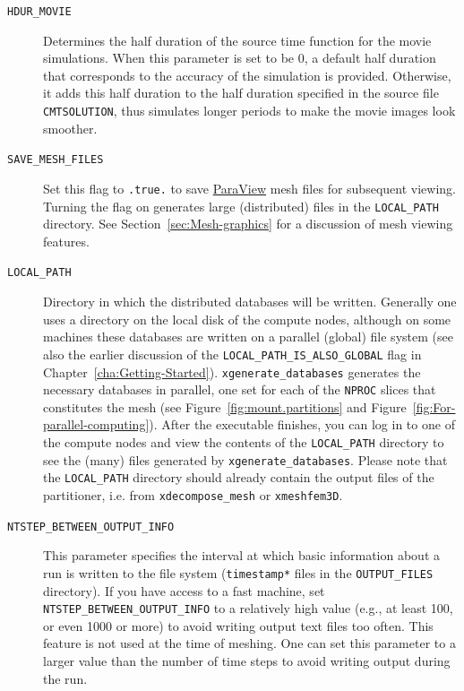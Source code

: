 \begin{description}
%
\item [{\texttt{HDUR\_MOVIE}}] Determines the half duration of the source
time function for the movie simulations. When this parameter is set
to be 0, a default half duration that corresponds to the accuracy
of the simulation is provided. Otherwise, it adds this half duration
to the half duration specified in the source file \texttt{CMTSOLUTION},
thus simulates longer periods to make the movie images look smoother.
%
\item [{\texttt{SAVE\_MESH\_FILES}}] Set this flag to \texttt{.true.} to
save \href{www.paraview.org}{ParaView} mesh files for
subsequent viewing. Turning the flag on generates large (distributed)
files in the \texttt{LOCAL\_PATH} directory. See Section~\ref{sec:Mesh-graphics}
for a discussion of mesh viewing features.
%
\item [{\texttt{LOCAL\_PATH}}] Directory in which the distributed databases
will be written. Generally one uses a directory on the local disk
of the compute nodes, although on some machines these databases are
written on a parallel (global) file system (see also the earlier discussion
of the \texttt{LOCAL\_PATH\_IS\_ALSO\_GLOBAL} flag in Chapter~\ref{cha:Getting-Started}).
\texttt{xgenerate\_databases} generates the necessary databases in
parallel, one set for each of the \texttt{NPROC} slices that constitutes
the mesh (see Figure~\ref{fig:mount.partitions} and Figure~\ref{fig:For-parallel-computing}).
After the executable finishes, you can log in to one of the compute
nodes and view the contents of the \texttt{LOCAL\_PATH} directory
to see the (many) files generated by \texttt{xgenerate\_databases}.
Please note that the \texttt{LOCAL\_PATH} directory should already
contain the output files of the partitioner, i.e. from \texttt{xdecompose\_mesh}
or \texttt{xmeshfem3D}.
%
\item [{\texttt{NTSTEP\_BETWEEN\_OUTPUT\_INFO}}] This parameter specifies
the interval at which basic information about a run is written to
the file system (\texttt{timestamp{*}} files in the \texttt{OUTPUT\_FILES}
directory). If you have access to a fast machine, set \texttt{NTSTEP\_BETWEEN\_OUTPUT\_INFO}
to a relatively high value (e.g., at least 100, or even 1000 or more)
to avoid writing output text files too often. This feature is not
used at the time of meshing. One can set this parameter to a larger
value than the number of time steps to avoid writing output during
the run.
\end{description}

